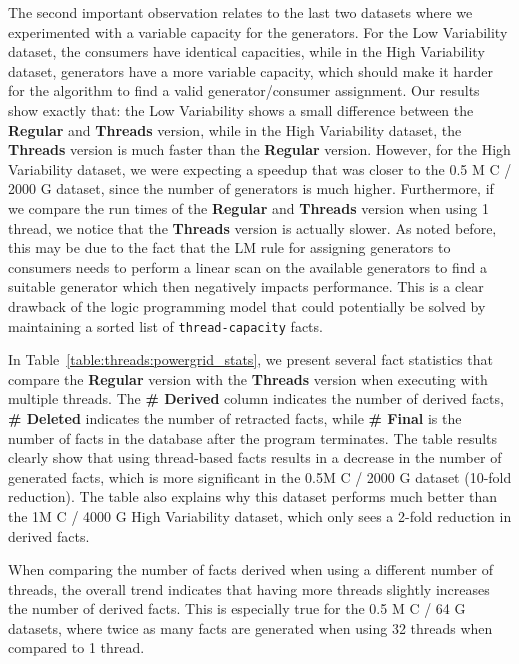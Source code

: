 The second important observation relates to the last two datasets where we
experimented with a variable capacity for the generators. For the Low
Variability dataset, the consumers have identical capacities, while in the High
Variability dataset, generators have a more variable capacity, which should make
it harder for the algorithm to find a valid generator/consumer assignment.  Our
results show exactly that: the Low Variability shows a small difference between
the \textbf{Regular} and \textbf{Threads} version, while in the High Variability
dataset, the \textbf{Threads} version is much faster than the \textbf{Regular}
version. However, for the High Variability dataset, we were expecting a speedup
that was closer to the 0.5 M C / 2000 G dataset, since the number of generators
is much higher. Furthermore, if we compare the run times of the \textbf{Regular}
and \textbf{Threads} version when using 1 thread, we notice that the
\textbf{Threads} version is actually slower. As noted before, this may be due to
the fact that the LM rule for assigning generators to consumers needs to perform
a linear scan on the available generators to find a suitable generator which
then negatively impacts performance. This is a clear drawback of the logic
programming model that could potentially be solved by maintaining a sorted list
of \texttt{thread-capacity} facts.

In Table~\ref{table:threads:powergrid_stats}, we present several fact statistics
that compare the \textbf{Regular} version with the \textbf{Threads} version when
executing with multiple threads. The \textbf{\# Derived} column indicates the
number of derived facts, \textbf{\# Deleted} indicates the number of retracted
facts, while \textbf{\# Final} is the number of facts in the database after the
program terminates. The table results clearly show that using thread-based facts
results in a decrease in the number of generated facts, which is more
significant in the 0.5M C / 2000 G dataset (10-fold reduction). The table also
explains why this dataset performs much better than the 1M C / 4000 G High
Variability dataset, which only sees a 2-fold reduction in derived facts.

When comparing the number of facts derived when using a different number of
threads, the overall trend indicates that having more threads slightly increases
the number of derived facts. This is especially true for the 0.5 M C / 64 G
datasets, where twice as many facts are generated when using 32 threads when
compared to 1 thread.

\begin{table}[ht]
   \begin{center}
      
   \end{center}


   \label{table:threads:powergrid_stats}
\end{table}

